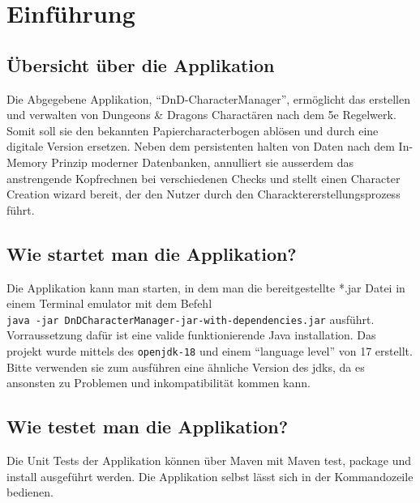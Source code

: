 \chapter{Einführung}

\section{Übersicht über die Applikation}
Die Abgegebene Applikation, \enquote{DnD-CharacterManager}, ermöglicht das erstellen und verwalten von Dungeons \& Dragons Charactären nach dem 5e Regelwerk. Somit soll sie den bekannten Papiercharacterbogen ablösen und durch eine digitale Version ersetzen. Neben dem persistenten halten von Daten nach dem In-Memory Prinzip moderner Datenbanken, annulliert sie ausserdem das anstrengende Kopfrechnen bei verschiedenen Checks und stellt einen Character Creation wizard bereit, der den Nutzer durch den Characktererstellungsprozess führt.

\section{Wie startet man die Applikation?}
Die Applikation kann man starten, in dem man die bereitgestellte *.jar Datei in einem Terminal emulator mit dem Befehl
\\\texttt{java -jar DnDCharacterManager-jar-with-dependencies.jar} ausführt. Vorraussetzung dafür ist eine valide funktionierende Java installation. Das projekt wurde mittels des \texttt{openjdk-18} und einem \enquote{language level} von 17 erstellt. Bitte verwenden sie zum ausführen eine ähnliche Version des jdks, da es ansonsten zu Problemen und inkompatibilität kommen kann.

\section{Wie testet man die Applikation?}
Die Unit Tests der Applikation können über Maven mit Maven test, package und install ausgeführt werden. Die Applikation selbst lässt sich in der Kommandozeile bedienen.
